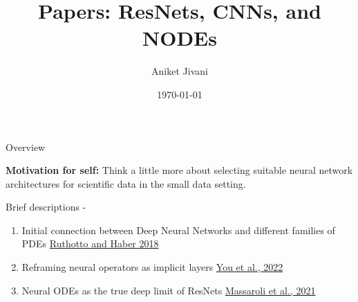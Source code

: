 \documentclass[usenames,dvipsnames]{beamer}
\title[Seminar]{Papers: ResNets, CNNs, and NODEs}
\author[AJ]{Aniket Jivani}
\date{\today}
\theoremstyle{definition}
\begin{document}
\begin{frame}
\titlepage %
\end{frame}



\begin{frame}{Overview}


\textbf{Motivation for self:} Think a little more about selecting suitable neural network architectures for scientific data in the small data setting.

Brief descriptions - 

\begin{enumerate}
    \item Initial connection between Deep Neural Networks and different families of PDEs \href{https://arxiv.org/abs/1804.04272}{Ruthotto and Haber 2018}
    
    \item Reframing neural operators as implicit layers \href{https://arxiv.org/abs/2203.08205}{You et al., 2022}
    
    \item Neural ODEs as the true deep limit of ResNets \href{https://arxiv.org/abs/2002.08071}{Massaroli et al., 2021}
\end{enumerate}

\end{frame}
\end{document}
